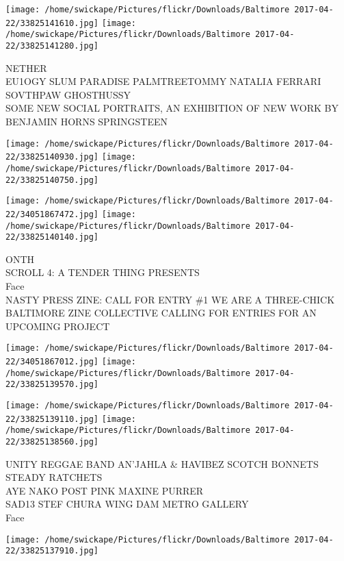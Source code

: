 \documentclass[10pt,letterpaper]{article}
\begin{document}
\vspace{0.25in}
\texttt{[image: /home/swickape/Pictures/flickr/Downloads/Baltimore 2017-04-22/33825141610.jpg]}
\texttt{[image: /home/swickape/Pictures/flickr/Downloads/Baltimore 2017-04-22/33825141280.jpg]}

NETHER\\
EU1OGY SLUM PARADISE PALMTREETOMMY NATALIA FERRARI SOVTHPAW GHOSTHUSSY\\
SOME NEW SOCIAL PORTRAITS, AN EXHIBITION OF NEW WORK BY BENJAMIN HORNS SPRINGSTEEN\\
\pagebreak

\texttt{[image: /home/swickape/Pictures/flickr/Downloads/Baltimore 2017-04-22/33825140930.jpg]}
\texttt{[image: /home/swickape/Pictures/flickr/Downloads/Baltimore 2017-04-22/33825140750.jpg]}

\texttt{[image: /home/swickape/Pictures/flickr/Downloads/Baltimore 2017-04-22/34051867472.jpg]}
\texttt{[image: /home/swickape/Pictures/flickr/Downloads/Baltimore 2017-04-22/33825140140.jpg]}

ONTH\\
SCROLL 4: A TENDER THING PRESENTS\\
Face\\
NASTY PRESS ZINE: CALL FOR ENTRY \#1 WE ARE A THREE{-}CHICK BALTIMORE ZINE COLLECTIVE CALLING FOR ENTRIES FOR AN UPCOMING PROJECT\\
\pagebreak

\texttt{[image: /home/swickape/Pictures/flickr/Downloads/Baltimore 2017-04-22/34051867012.jpg]}
\texttt{[image: /home/swickape/Pictures/flickr/Downloads/Baltimore 2017-04-22/33825139570.jpg]}

\texttt{[image: /home/swickape/Pictures/flickr/Downloads/Baltimore 2017-04-22/33825139110.jpg]}
\texttt{[image: /home/swickape/Pictures/flickr/Downloads/Baltimore 2017-04-22/33825138560.jpg]}

UNITY REGGAE BAND AN'JAHLA \& HAVIBEZ SCOTCH BONNETS STEADY RATCHETS\\
AYE NAKO POST PINK MAXINE PURRER\\
SAD13 STEF CHURA WING DAM METRO GALLERY\\
Face\\
\pagebreak

\texttt{[image: /home/swickape/Pictures/flickr/Downloads/Baltimore 2017-04-22/33825137910.jpg]}
\end{document}
